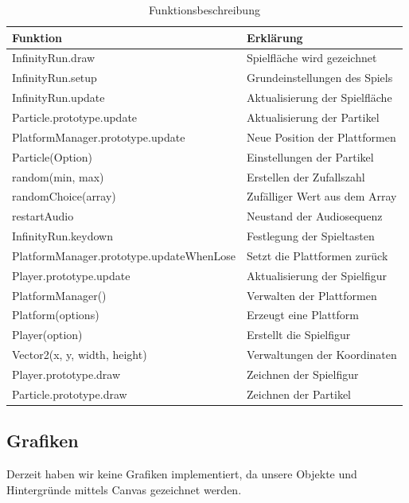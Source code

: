 \begin{table}[h]
	\begin{tabular}{|l|l|}
		\toprule
		\textbf{Funktion}& \textbf{Erklärung}\\
		\midrule
		InfinityRun.draw & Spielfläche wird gezeichnet	\\ 
		InfinityRun.setup & Grundeinstellungen des Spiels	\\
		InfinityRun.update & Aktualisierung der Spielfläche	\\ 
		Particle.prototype.update & Aktualisierung der Partikel	\\ 
		PlatformManager.prototype.update & Neue Position der Plattformen	\\ 
		Particle(Option) & Einstellungen der Partikel	\\ 
		random(min, max) & Erstellen der Zufallszahl\\
		randomChoice(array) & Zufälliger Wert aus dem Array	\\
		restartAudio & Neustand der Audiosequenz	\\
		InfinityRun.keydown & Festlegung der Spieltasten	\\
		PlatformManager.prototype.updateWhenLose & Setzt die Plattformen zurück	\\
		Player.prototype.update & Aktualisierung der Spielfigur	\\
		PlatformManager() & Verwalten der Plattformen	\\
		Platform(options) & Erzeugt eine Plattform	\\
		Player(option) & Erstellt die Spielfigur	\\
		Vector2(x, y, width, height) & Verwaltungen der Koordinaten	\\
		Player.prototype.draw & Zeichnen der Spielfigur	\\
		Particle.prototype.draw & Zeichnen der Partikel	\\
		\bottomrule
	\end{tabular}
	\caption{Funktionsbeschreibung}
\end{table}
\subsection{Grafiken}
Derzeit haben wir keine Grafiken implementiert, da unsere Objekte und Hintergründe mittels Canvas gezeichnet werden.
\newpage
